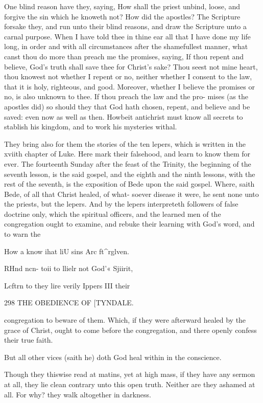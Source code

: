 \documentclass{custom}
\begin{document}
{One blind reason have they, saying, How shall the 
priest unbind, loose, and forgive the sin which he knoweth 
not? How did the apostles? The Scripture forsake 
they, and run unto their blind reasons, and draw the 
Scripture unto a carnal purpose. When I have told thee 
in thine ear all that I have done my life long, in order and 
with all circumstances after the shamefullest manner, what 
canst thou do more than preach me the promises, saying, 
If thou repent and believe, God's truth shall save thee 
for Christ's sake? Thou seest not mine heart, thou 
knowest not whether I repent or no, neither whether I 
consent to the law, that it is holy, righteous, and good. 
Moreover, whether I believe the promises or no, is also 
unknown to thee. If thou preach the law and the pro- 
mises (as the apostles did) so should they that God hath 
chosen, repent, and believe and be saved: even now as 
well as then. Howbeit antichrist must know all secrets 
to stablish his kingdom, and to work his mysteries withal. 

They bring also for them the stories of the ten lepers, 
which is written in the xviith chapter of Luke. Here 
mark their falsehood, and learn to know them for ever. 
The fourteenth Sunday after the feast of the Trinity, the 
beginning of the seventh lesson, is the said gospel, and 
the eighth and the ninth lessons, with the rest of the 
seventh, is the exposition of Bede upon the said gospel. 
Where, saith Bede, of all that Christ healed, of what- 
soever disease it were, he sent none unto the priests, but 
the lepers. And by the lepers interpreteth followers of 
false doctrine only, which the spiritual officers, and the 
learned men of the congregation ought to examine, and 
rebuke their learning with God's word, and to warn the

How a 
know ihat 
liU sins Arc 
ft^rglven. 

RHnd ncn- 
toii to llielr 
not God'« 
Sjiirit, 

Lcftrn to 
they lire 
verily 
Ippers III 
their 


298
THE OBEDIENCE OF
[TYNDALE.

congregation to beware of them. Which, if they were 
afterward healed by the grace of Christ, ought to come 
before the congregation, and there openly confess their 
true faith. 

But all other vices (saith he) doth God heal within in 
the conscience. 

Though they thiswise read at matins, yet at high mass, if 
they have any sermon at all, they lie clean contrary unto this 
open truth. Neither are they ashamed at all. For why? 
they walk altogether in darkness. 


}
\end{document}
